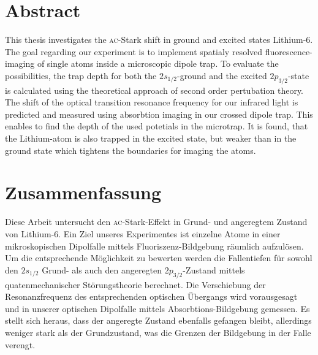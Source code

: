 \section*{Abstract}

This thesis investigates the \textsc{ac}-Stark shift in ground and excited states Lithium-6. 
The goal regarding our experiment is to implement spatialy resolved fluorescence-imaging of single atoms inside a microscopic dipole trap. To evaluate the possibilities, the trap depth for both the $2s_{1/2}$-ground and the excited $2p_{3/2}$-state is calculated using the theoretical approach of second order pertubation theory. The shift of the optical transition resonance frequency for our infrared light is predicted and measured using absorbtion imaging in our crossed dipole trap. This enables to find the depth of the used potetials in the microtrap. It is found, that the Lithium-atom is also trapped in the excited state, but weaker than in the ground state which tightens the boundaries for imaging the atoms.

\section*{Zusammenfassung}

Diese Arbeit untersucht den \textsc{ac}-Stark-Effekt in Grund- und angeregtem Zustand von Lithium-6. Ein Ziel unseres Experimentes ist einzelne Atome in einer mikroskopischen Dipolfalle mittels Fluoriszenz-Bildgebung räumlich aufzulösen. Um die entsprechende Möglichkeit zu bewerten werden die Fallentiefen für sowohl den $2s_{1/2}$ Grund- als auch den angeregten $2p_{3/2}$-Zustand mittels quatenmechanischer Störungstheorie berechnet. Die Verschiebung der Resonanzfrequenz des entsprechenden optischen Übergangs wird vorausgesagt und in unserer optischen Dipolfalle mittels Absorbtions-Bildgebung gemessen. Es stellt sich heraus, dass der angeregte Zustand ebenfalls gefangen bleibt, allerdings weniger stark als der Grundzustand, was die Grenzen der Bildgebung in der Falle verengt.
